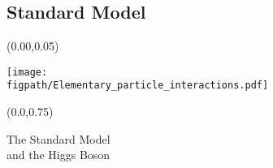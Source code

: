 

\subsection{Standard Model}

{
\begin{frame}
	\begin{textblock}{1.0}(0.00,0.05)
		\begin{center}
			\texttt{[image: \\figpath/Elementary\_particle\_interactions.pdf]}
		\end{center}	
	\end{textblock}
	\begin{textblock}{1.0}(0.0,0.75)
		\begin{center}
			\Huge
			The Standard Model\\
			\large
			and the Higgs Boson
		\end{center}
	\end{textblock}
\end{frame}
}

\begin{comment}
\begin{frame}
    \setbeamercolor{section in toc shaded}{use=structure,fg=tamugray}%
	\setbeamercolor{section in toc}{fg=tamumaroon}
	\setbeamercolor{subsection in toc shaded}{fg=black}
	\setbeamercolor{subsection in toc}{fg=tamumaroon}
    \setbeamerfont{subsection in toc}{size=\large,series=\bf}
    \setbeamerfont{section in toc}{size=\Large,series=\bf}
    \tableofcontents[currentsection]
\end{frame}
\end{comment}

